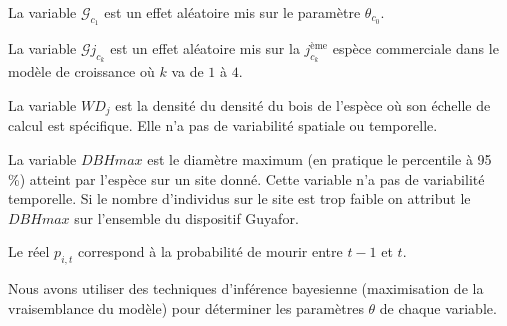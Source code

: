 \documentclass[review]{elsarticle}
\begin{document}

\noindent La variable $\mathcal{G}_{c_{1}}$ est un effet aléatoire mis sur le paramètre $\theta_{c_{0}}.$

\noindent La variable $\mathcal{G}{j_{c_{k}}}$ est un effet aléatoire mis sur la $j_{c_{k}}^{\text{ème}}$ espèce commerciale dans le modèle de croissance où $k$ va de $1$ à $4.$


\noindent La variable $WD_{j}$ est la densité du densité du bois de l'espèce où son échelle de calcul est spécifique. Elle n'a pas de variabilité spatiale ou temporelle.

\noindent La variable $DBHmax$ est le diamètre maximum (en pratique le percentile à 95 \%) atteint par l'espèce sur un site donné. Cette variable n'a pas de variabilité temporelle. Si le nombre d'individus sur le site est trop faible on attribut le $DBHmax$ sur l'ensemble du dispositif Guyafor.

Le réel $p_{i,t}$ correspond à la probabilité de mourir entre $t-1$ et $t.$
 
\noindent Nous avons utiliser des techniques d'inférence bayesienne (maximisation de la vraisemblance du modèle) pour déterminer les paramètres $\theta$ de chaque variable.
 
 
\end{document}

